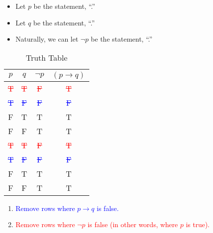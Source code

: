 \documentclass{article}
\begin{document}
\begin{enumerate}
          \begin{itemize}
              \item Let $p$ be the statement, ``.''
              \item Let $q$ be the statement, ``.''
              \item Naturally, we can let $\neg p$ be the statement, ``.''
          \end{itemize}

          \begin{table}[h]
              \centering
              \begin{tabular}{|c|c||c|c|}
                  \hline
                  $p$                        & $q$                        & $\neg p$                   & $(p \rightarrow q)$        \\ \hline
                  \hline
                  \textcolor{red}{\sout{T}}  & \textcolor{red}{\sout{T}}  & \textcolor{red}{\sout{F}}  & \textcolor{red}{\sout{T}}  \\ \hline
                  \textcolor{blue}{\sout{T}} & \textcolor{blue}{\sout{F}} & \textcolor{blue}{\sout{F}} & \textcolor{blue}{\sout{F}} \\ \hline
                  F                          & T                          & T                          & T                          \\ \hline
                  F                          & F                          & T                          & T                          \\ \hline
                  \textcolor{red}{\sout{T}}  & \textcolor{red}{\sout{T}}  & \textcolor{red}{\sout{F}}  & \textcolor{red}{\sout{T}}  \\ \hline
                  \textcolor{blue}{\sout{T}} & \textcolor{blue}{\sout{F}} & \textcolor{blue}{\sout{F}} & \textcolor{blue}{\sout{F}} \\ \hline
                  F                          & T                          & T                          & T                          \\ \hline
                  F                          & F                          & T                          & T                          \\ \hline
              \end{tabular}
              \caption{Truth Table}
          \end{table}

          \begin{enumerate}
              \item \textcolor{blue}{Remove rows where $p \rightarrow q$ is false.}
              \item \textcolor{red}{Remove rows where $\neg p$ is false (in other words, where $p$ is true).}
          \end{enumerate}


\end{enumerate}
\end{document}
